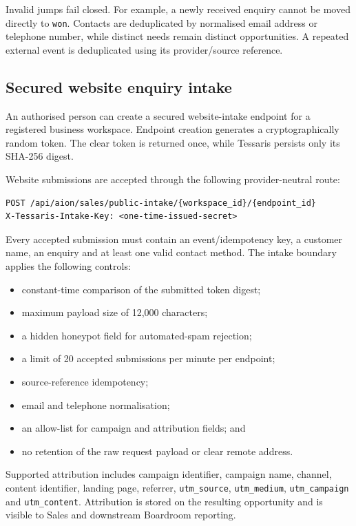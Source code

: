 Invalid jumps fail closed. For example, a newly received enquiry cannot be moved directly to \texttt{won}. Contacts are deduplicated by normalised email address or telephone number, while distinct needs remain distinct opportunities. A repeated external event is deduplicated using its provider/source reference.

\subsection{Secured website enquiry intake}

An authorised person can create a secured website-intake endpoint for a registered business workspace. Endpoint creation generates a cryptographically random token. The clear token is returned once, while Tessaris persists only its SHA-256 digest.

Website submissions are accepted through the following provider-neutral route:

\begin{verbatim}
POST /api/aion/sales/public-intake/{workspace_id}/{endpoint_id}
X-Tessaris-Intake-Key: <one-time-issued-secret>
\end{verbatim}

Every accepted submission must contain an event/idempotency key, a customer name, an enquiry and at least one valid contact method. The intake boundary applies the following controls:

\begin{itemize}[leftmargin=*]
    \item constant-time comparison of the submitted token digest;
    \item maximum payload size of 12,000 characters;
    \item a hidden honeypot field for automated-spam rejection;
    \item a limit of 20 accepted submissions per minute per endpoint;
    \item source-reference idempotency;
    \item email and telephone normalisation;
    \item an allow-list for campaign and attribution fields; and
    \item no retention of the raw request payload or clear remote address.
\end{itemize}

Supported attribution includes campaign identifier, campaign name, channel, content identifier, landing page, referrer, \texttt{utm\_source}, \texttt{utm\_medium}, \texttt{utm\_campaign} and \texttt{utm\_content}. Attribution is stored on the resulting opportunity and is visible to Sales and downstream Boardroom reporting.

